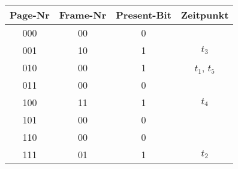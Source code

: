 \documentclass[a4paper, 12pt, margins=2cm]{homework}
\begin{document}
\begin{problem}
  
\end{problem}
\begin{solution}\hfill
  \begin{center}
      \begin{tabular}{|c|c|c|c|}
        \hline
        Page-Nr & Frame-Nr & Present-Bit & Zeitpunkt    \\ \hline \hline
        000     & 00       & 0           &              \\ \hline
        001     & 10       & 1           & $t_3$        \\ \hline
        010     & 00       & 1           & $t_1$, $t_5$ \\ \hline
        011     & 00       & 0           &              \\ \hline
        100     & 11       & 1           & $t_4$        \\ \hline
        101     & 00       & 0           &              \\ \hline
        110     & 00       & 0           &              \\ \hline
        111     & 01       & 1           & $t_2$        \\ \hline
      \end{tabular}
  \end{center}


\end{solution}
\end{document}
